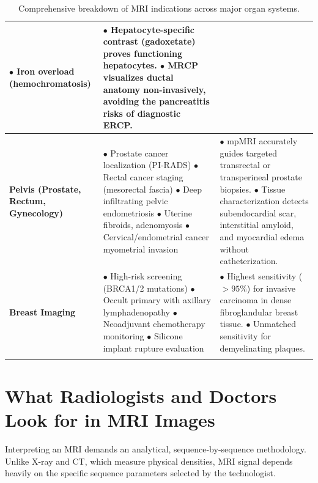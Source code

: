 \documentclass[11pt,a4paper]{article}
\begin{document}
\begin{longtable}{p{3.2cm}p{6cm}p{6cm}}
$\bullet$ Iron overload (hemochromatosis) & 
$\bullet$ Hepatocyte-specific contrast (gadoxetate) proves functioning hepatocytes.\newline
$\bullet$ MRCP visualizes ductal anatomy non-invasively, avoiding the pancreatitis risks of diagnostic ERCP. \\
\midrule
\textbf{Pelvis (Prostate, Rectum, Gynecology)} & 
$\bullet$ Prostate cancer localization (PI-RADS)\newline
$\bullet$ Rectal cancer staging (mesorectal fascia)\newline
$\bullet$ Deep infiltrating pelvic endometriosis\newline
$\bullet$ Uterine fibroids, adenomyosis\newline
$\bullet$ Cervical/endometrial cancer myometrial invasion & 
$\bullet$ mpMRI accurately guides targeted transrectal or transperineal prostate biopsies.\newline
$\bullet$ Tissue characterization detects subendocardial scar, interstitial amyloid, and myocardial edema without catheterization. \\
\midrule
\textbf{Breast Imaging} & 
$\bullet$ High-risk screening (BRCA1/2 mutations)\newline
$\bullet$ Occult primary with axillary lymphadenopathy\newline
$\bullet$ Neoadjuvant chemotherapy monitoring\newline
$\bullet$ Silicone implant rupture evaluation & 
$\bullet$ Highest sensitivity ($>95\%$) for invasive carcinoma in dense fibroglandular breast tissue.\newline
$\bullet$ Unmatched sensitivity for demyelinating plaques. \\
\bottomrule
\caption{Comprehensive breakdown of MRI indications across major organ systems.}
\label{tab:clinical_indications}
\end{longtable}

\section{What Radiologists and Doctors Look for in MRI Images}

Interpreting an MRI demands an analytical, sequence-by-sequence methodology. Unlike X-ray and CT, which measure physical densities, MRI signal depends heavily on the specific sequence parameters selected by the technologist.
\end{document}
